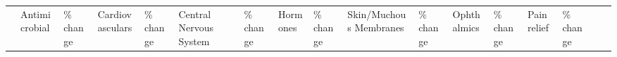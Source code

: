 \documentclass[
]{book}
\begin{document}
\begin{longtable}[]{@{}lllllllllllllllll@{}}
\toprule
\begin{minipage}[b]{0.03\columnwidth}\raggedright
\strut
\end{minipage} & \begin{minipage}[b]{0.04\columnwidth}\raggedright
Antimicrobial\strut
\end{minipage} & \begin{minipage}[b]{0.03\columnwidth}\raggedright
\% change\strut
\end{minipage} & \begin{minipage}[b]{0.04\columnwidth}\raggedright
Cardiovasculars\strut
\end{minipage} & \begin{minipage}[b]{0.03\columnwidth}\raggedright
\% change\strut
\end{minipage} & \begin{minipage}[b]{0.05\columnwidth}\raggedright
Central Nervous System\strut
\end{minipage} & \begin{minipage}[b]{0.03\columnwidth}\raggedright
\% change\strut
\end{minipage} & \begin{minipage}[b]{0.03\columnwidth}\raggedright
Hormones\strut
\end{minipage} & \begin{minipage}[b]{0.03\columnwidth}\raggedright
\% change\strut
\end{minipage} & \begin{minipage}[b]{0.05\columnwidth}\raggedright
Skin/Muchous Membranes\strut
\end{minipage} & \begin{minipage}[b]{0.03\columnwidth}\raggedright
\% change\strut
\end{minipage} & \begin{minipage}[b]{0.03\columnwidth}\raggedright
Ophthalmics\strut
\end{minipage} & \begin{minipage}[b]{0.03\columnwidth}\raggedright
\% change\strut
\end{minipage} & \begin{minipage}[b]{0.04\columnwidth}\raggedright
Pain relief\strut
\end{minipage} & \begin{minipage}[b]{0.03\columnwidth}\raggedright
\% change\strut
\end{minipage} & \begin{minipage}[b]{0.04\columnwidth}\raggedright

\end{minipage}
\end{longtable}
\end{document}
